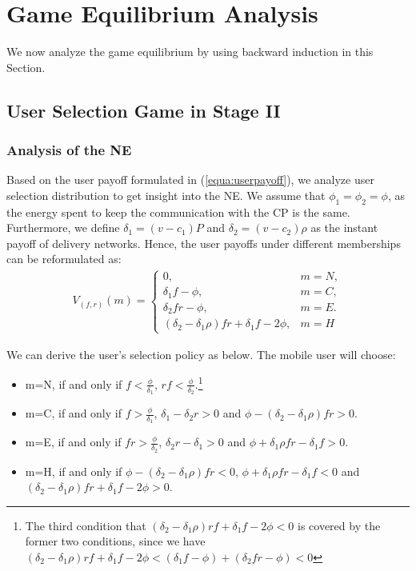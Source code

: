 \section{Game Equilibrium Analysis}
We now analyze the game equilibrium by using backward induction in this Section.
\subsection{User Selection Game in Stage II}
	
\subsubsection{Analysis of the NE}
 
Based on the user payoff formulated in (\ref{equa:userpayoff}), we analyze user selection distribution to get insight into the NE. We assume that $\phi_1 = \phi_2 = \phi$, as the energy spent to keep the communication with the CP is the same. Furthermore, we define $\delta_1=(v-c_1)P$ and $\delta_2=(v-c_2)\rho$ as the instant payoff of delivery networks. Hence, the user payoffs under different memberships can be reformulated as:
\begin{equation}
\begin{array}{l}
V_{(f,r)}(m)=
\left\{\begin{array}{ll}
0, & m=N,\\
\delta_1f-\phi, &m= C,\\
\delta_2fr-\phi, & m=E.\\
(\delta_2-\delta_1\rho)fr+\delta_1f-2\phi, &m=H
\end{array}\right.
\end{array}
\end{equation}

We can derive the user's selection policy as below. The mobile user will choose:

\begin{itemize}
\item m=N, if and only if $f<\frac{\phi}{\delta_1}$, $rf<\frac{\phi}{\delta_2}$.\footnote{The third condition that $(\delta_2-\delta_1\rho)rf+\delta_1f-2\phi<0$ is covered by the former two conditions, since we have $(\delta_2-\delta_1\rho)rf+\delta_1f-2\phi<(\delta_1f-\phi)+(\delta_2fr-\phi)<0$ }
\item m=C, if and only if $f>\frac{\phi}{\delta_1}$, $\delta_1-\delta_2r>0$ and $\phi-(\delta_2-\delta_1\rho)fr>0$.
\item m=E, if and only if $fr>\frac{\phi}{\delta_2}$, $\delta_2r-\delta_1>0$ and $\phi+\delta_1\rho fr-\delta_1f>0$.
\item m=H, if and only if $\phi-(\delta_2-\delta_1\rho)fr<0$, $\phi+\delta_1\rho fr-\delta_1f<0$ and $(\delta_2-\delta_1\rho)fr+\delta_1f-2\phi>0$.
\end{itemize}

